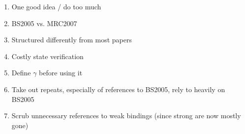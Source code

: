 \documentclass[12pt]{article}
\newcommand{\ga}{\gamma}
\begin{document}
\begin{enumerate}
\begin{itemize}
\begin{itemize}
				\end{itemize}
			\item Possible puzzle to explain: WEC has an effect here, and that effect is weakened by the change in EC rules during the Uruguay Round
			\item Read Chad's ``Why Are Safeguards under the WTO So Unpopular?'' (World Trade Review 2002), at \url{C:\Users\Kristy\Dropbox\Research\PE_shocks\Literature\2016}
				\begin{itemize}
					\item Need to understand better what changed, both with safeguard and with other policy instruments
				\end{itemize}
			\item There is this drop off in usage of escape clause (EC) after Uruguay Round (UR) reforms, even though retaliation prohibited for first three years. Why, when retaliation goes \textit{away}?
			\item I'm not sure there's a way to make sense of Ben's point: in my set-up, government doesn't ``get'' something different from lobby than it does directly from the shock. Maybe it should.
				\begin{itemize}
					\item Government feels $\ga$ the same whether it's elevated because of $s$ or because of $e$
					\item What is the neutralizing that happens? Why would the government invoke EC when it knows that WEC is coming anyway? Because it's in another sector where it puts less weight right now?
				\end{itemize}
			\item Need to go to continuous value of EC tariff
				\begin{itemize}
					\item There will be optimal tariff for whatever value of $s$ is realized
						\begin{itemize}
							\item Not sure how fine I want to go with $s$
						\end{itemize}
					\item Lobby will choose its optimal level of $e$. Will this be constrained in any way? Probably not, if there isn't a fixed EC-binding.
				\end{itemize}
			\end{itemize}
	\item One good idea / do too much
	\item BS2005 vs. MRC2007
	\item Structured differently from most papers
	\item Costly state verification
	\item Define $\ga$ before using it
	\item Take out repeats, especially of references to BS2005, rely to heavily on BS2005
	\item Scrub unnecessary references to weak bindings (since strong are now mostly gone)
\end{enumerate}
\end{document}

